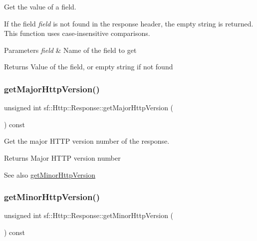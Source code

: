 Get the value of a field. 

If the field {\itshape field} is not found in the response header, the empty string is returned. This function uses case-\/insensitive comparisons.


\begin{DoxyParams}{Parameters}
{\em field} & Name of the field to get\\
\hline
\end{DoxyParams}
\begin{DoxyReturn}{Returns}
Value of the field, or empty string if not found 
\end{DoxyReturn}
\mbox{\label{classsf_1_1_http_1_1_response_ab1c6948f6444fad34d0537e206e398b8}} 
\subsubsection{\texorpdfstring{get\+Major\+Http\+Version()}{getMajorHttpVersion()}}
{\footnotesize\ttfamily unsigned int sf\+::\+Http\+::\+Response\+::get\+Major\+Http\+Version (\begin{DoxyParamCaption}{ }\end{DoxyParamCaption}) const}



Get the major H\+T\+TP version number of the response. 

\begin{DoxyReturn}{Returns}
Major H\+T\+TP version number
\end{DoxyReturn}
\begin{DoxySeeAlso}{See also}
\hyperlink{classsf_1_1_http_1_1_response_af3c649568d2e291e71c3a7da546bb392}{get\+Minor\+Http\+Version} 
\end{DoxySeeAlso}
\mbox{\label{classsf_1_1_http_1_1_response_af3c649568d2e291e71c3a7da546bb392}} 
\subsubsection{\texorpdfstring{get\+Minor\+Http\+Version()}{getMinorHttpVersion()}}
{\footnotesize\ttfamily unsigned int sf\+::\+Http\+::\+Response\+::get\+Minor\+Http\+Version (\begin{DoxyParamCaption}{ }\end{DoxyParamCaption}) const}



